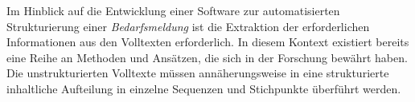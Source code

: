 Im Hinblick auf die Entwicklung einer Software zur automatisierten Strukturierung einer \emph{Bedarfsmeldung} ist die Extraktion der erforderlichen Informationen aus den Volltexten erforderlich. In diesem Kontext existiert bereits eine Reihe an Methoden und Ansätzen, die sich in der Forschung bewährt haben. Die unstrukturierten Volltexte müssen annäherungsweise in eine strukturierte inhaltliche Aufteilung in einzelne Sequenzen und Stichpunkte überführt werden.












